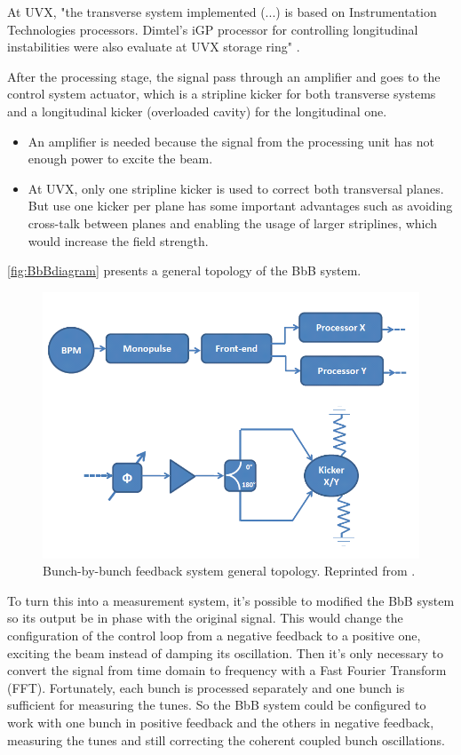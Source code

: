 At UVX, "the transverse system implemented (...) is based on Instrumentation Technologies processors. Dimtel's iGP processor for controlling longitudinal instabilities were also evaluate at UVX storage ring" \cite{digFeedback}.

After the processing stage, the signal pass through an amplifier and goes to the control system actuator, which is a stripline kicker for both transverse systems and a longitudinal kicker (overloaded cavity) for the longitudinal one.

\begin{itemize}
	\item An amplifier is needed because the signal from the processing unit has not enough power to excite the beam.
	\item At UVX, only one stripline kicker is used to correct both transversal planes. But use one kicker per plane has some important advantages such as avoiding cross-talk between planes and enabling the usage of larger striplines, which would increase the field strength.
\end{itemize}

\autoref{fig:BbBdiagram} presents a general topology of the BbB system.

\begin{figure}[!htb]
	\centering
	\includegraphics[width=0.8\linewidth]{./Figures/BbBdiagram.png}
	\caption{Bunch-by-bunch feedback system general topology. Reprinted from \cite{digFeedback}.}
	\label{fig:BbBdiagram}
\end{figure}

To turn this into a measurement system, it's possible to modified the BbB system so its output be in phase with the original signal. This would change the configuration of the control loop from a negative feedback to a positive one, exciting the beam instead of damping its oscillation. Then it's only necessary to convert the signal from time domain to frequency with a Fast Fourier Transform (FFT). Fortunately, each bunch is processed separately and one bunch is sufficient for measuring the tunes. So the BbB system could be configured to work with one bunch in positive feedback and the others in negative feedback, measuring the tunes and still correcting the coherent coupled bunch oscillations.

